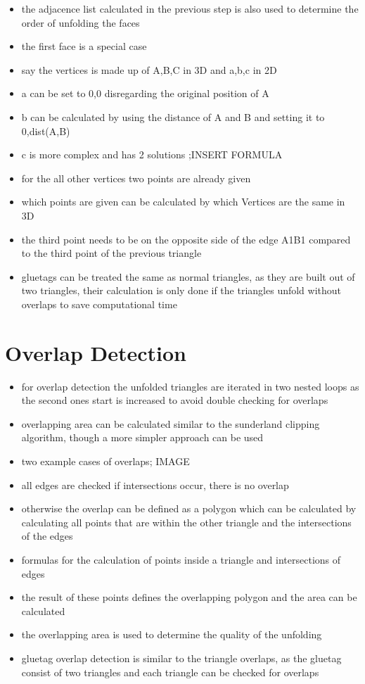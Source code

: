 \documentclass[draft,final]{vutinfth} %
\begin{document}
\begin{itemize}
	\item the adjacence list calculated in the previous step is also used to determine the order of unfolding the faces
	\item the first face is a special case
	\item say the vertices is made up of A,B,C in 3D and a,b,c in 2D
	\item a can be set to 0,0 disregarding the original position of A
	\item b can be calculated by using the distance of A and B and setting it to 0,dist(A,B)
	\item c is more complex and has 2 solutions ;INSERT FORMULA
	\item for the all other vertices two points are already given
	\item which points are given can be calculated by which Vertices are the same in 3D
	\item the third point needs to be on the opposite side of the edge A1B1 compared to the third point of the previous triangle
	\item gluetags can be treated the same as normal triangles, as they are built out of two triangles, their calculation is only done if the triangles unfold without overlaps to save computational time
\end{itemize}

\section{Overlap Detection}

\begin{itemize}
	\item for overlap detection the unfolded triangles are iterated in two nested loops as the second ones start is increased to avoid double checking for overlaps
	\item overlapping area can be calculated similar to the sunderland clipping algorithm, though a more simpler approach can be used
	\item two example cases of overlaps; IMAGE
	\item all edges are checked if intersections occur, there is no overlap
	\item otherwise the overlap can be defined as a polygon which can be calculated by calculating all points that are within the other triangle and the intersections of the edges
	\item formulas for the calculation of points inside a triangle and intersections of edges
	\item the result of these points defines the overlapping polygon and the area can be calculated
	\item the overlapping area is used to determine the quality of the unfolding
	\item gluetag overlap detection is similar to the triangle overlaps, as the gluetag consist of two triangles and each triangle can be checked for overlaps
\end{itemize}
\end{document}
